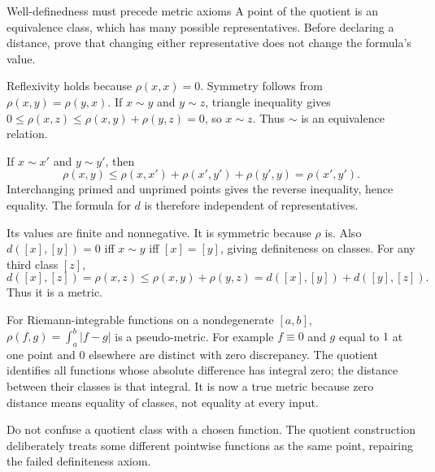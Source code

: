\begin{method}{Well-definedness must precede metric axioms}
A point of the quotient is an equivalence class, which has many possible representatives. Before declaring a distance, prove that changing either representative does not change the formula's value.
\end{method}
\begin{answer}
Reflexivity holds because $\rho(x,x)=0$. Symmetry follows from $\rho(x,y)=\rho(y,x)$. If $x\sim y$ and $y\sim z$, triangle inequality gives $0\le\rho(x,z)\le\rho(x,y)+\rho(y,z)=0$, so $x\sim z$. Thus $\sim$ is an equivalence relation.

If $x\sim x'$ and $y\sim y'$, then
\[\rho(x,y)\le\rho(x,x')+\rho(x',y')+\rho(y',y)=\rho(x',y').\]
Interchanging primed and unprimed points gives the reverse inequality, hence equality. The formula for $d$ is therefore independent of representatives.

Its values are finite and nonnegative. It is symmetric because $\rho$ is. Also $d([x],[y])=0$ iff $x\sim y$ iff $[x]=[y]$, giving definiteness on classes. For any third class $[z]$,
\[d([x],[z])=\rho(x,z)\le\rho(x,y)+\rho(y,z)=d([x],[y])+d([y],[z]).\]
Thus it is a metric.

For Riemann-integrable functions on a nondegenerate $[a,b]$, $\rho(f,g)=\int_a^b|f-g|$ is a pseudo-metric. For example $f\equiv0$ and $g$ equal to $1$ at one point and $0$ elsewhere are distinct with zero discrepancy. The quotient identifies all functions whose absolute difference has integral zero; the distance between their classes is that integral. It is now a true metric because zero distance means equality of classes, not equality at every input.
\end{answer}
\begin{tip}
Do not confuse a quotient class with a chosen function. The quotient construction deliberately treats some different pointwise functions as the same point, repairing the failed definiteness axiom.
\end{tip}

